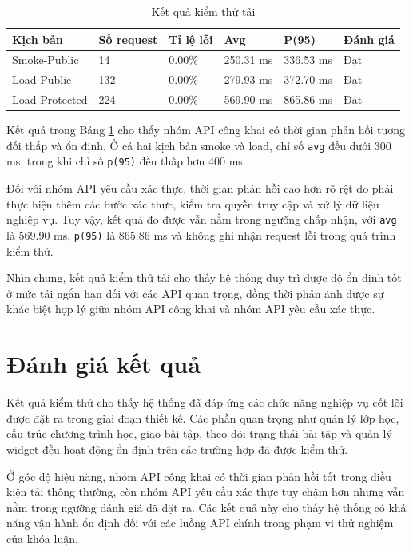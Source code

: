 \begin{table}[H]
\centering
\caption{Kết quả kiểm thử tải}
\label{tab:load-test-results}
\small
\begin{tabular}{|p{2.6cm}|p{2.2cm}|p{2.0cm}|p{2.3cm}|p{2.3cm}|p{1.8cm}|}
\hline
\textbf{Kịch bản} & \textbf{Số request} & \textbf{Tỉ lệ lỗi} & \textbf{Avg} & \textbf{P(95)} & \textbf{Đánh giá} \\ \hline

Smoke-Public & 14 & 0.00\% & 250.31 ms & 336.53 ms & Đạt \\ \hline

Load-Public & 132 & 0.00\% & 279.93 ms & 372.70 ms & Đạt \\ \hline

Load-Protected & 224 & 0.00\% & 569.90 ms & 865.86 ms & Đạt \\ \hline
\end{tabular}
\end{table}

Kết quả trong Bảng \ref{tab:load-test-results} cho thấy nhóm API công khai có thời gian phản hồi tương đối thấp và ổn định. Ở cả hai kịch bản smoke và load, chỉ số \texttt{avg} đều dưới 300 ms, trong khi chỉ số \texttt{p(95)} đều thấp hơn 400 ms.

Đối với nhóm API yêu cầu xác thực, thời gian phản hồi cao hơn rõ rệt do phải thực hiện thêm các bước xác thực, kiểm tra quyền truy cập và xử lý dữ liệu nghiệp vụ. Tuy vậy, kết quả đo được vẫn nằm trong ngưỡng chấp nhận, với \texttt{avg} là 569.90 ms, \texttt{p(95)} là 865.86 ms và không ghi nhận request lỗi trong quá trình kiểm thử.

Nhìn chung, kết quả kiểm thử tải cho thấy hệ thống duy trì được độ ổn định tốt ở mức tải ngắn hạn đối với các API quan trọng, đồng thời phản ánh được sự khác biệt hợp lý giữa nhóm API công khai và nhóm API yêu cầu xác thực.

\section{Đánh giá kết quả}

Kết quả kiểm thử cho thấy hệ thống đã đáp ứng các chức năng nghiệp vụ cốt lõi được đặt ra trong giai đoạn thiết kế. Các phần quan trọng như quản lý lớp học, cấu trúc chương trình học, giao bài tập, theo dõi trạng thái bài tập và quản lý widget đều hoạt động ổn định trên các trường hợp đã được kiểm thử.

Ở góc độ hiệu năng, nhóm API công khai có thời gian phản hồi tốt trong điều kiện tải thông thường, còn nhóm API yêu cầu xác thực tuy chậm hơn nhưng vẫn nằm trong ngưỡng đánh giá đã đặt ra. Các kết quả này cho thấy hệ thống có khả năng vận hành ổn định đối với các luồng API chính trong phạm vi thử nghiệm của khóa luận.

